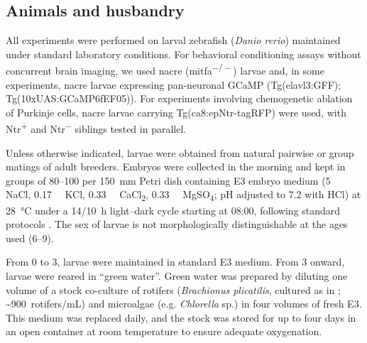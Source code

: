 \subsection{Animals and husbandry}

All experiments were performed on larval zebrafish (\textit{Danio rerio}) maintained under standard laboratory conditions. For behavioral conditioning assays without concurrent brain imaging, we used nacre (mitfa\textsuperscript{\(-/-\)}) larvae and, in some experiments, nacre larvae expressing pan-neuronal GCaMP (Tg(elavl3:GFF); Tg(10xUAS:GCaMP6fEF05)). For experiments involving chemogenetic ablation of Purkinje cells, nacre larvae carrying Tg(ca8:epNtr-tagRFP) were used, with Ntr\textsuperscript{\(+\)} and Ntr\textsuperscript{\(-\)} siblings tested in parallel.

Unless otherwise indicated, larvae were obtained from natural pairwise or group matings of adult breeders. Embryos were collected in the morning and kept in groups of 80--100 per 150~mm Petri dish containing E3 embryo medium (\SI{5}{\milli\Molar} NaCl, \SI{0.17}{\milli\Molar} KCl, \SI{0.33}{\milli\Molar} CaCl\textsubscript{2}, \SI{0.33}{\milli\Molar} MgSO\textsubscript{4}; pH adjusted to 7.2 with HCl) at \SI{28}{\degreeCelsius} under a 14/10~h light--dark cycle starting at 08:00, following standard protocols \citep{Westerfield2007,Martins2016}. The sex of larvae is not morphologically distinguishable at the ages used (\SIrange{6}{9}{\dpf}). %

From \SI{0}{\dpf} to \SI{3}{\dpf}, larvae were maintained in standard E3 medium. From \SI{3}{\dpf} onward, larvae were reared in ``green water''. Green water was prepared by diluting one volume of a stock co-culture of rotifers (\textit{Brachionus plicatilis}, cultured as in \citet{Martins2016}; \textasciitilde900~rotifers/mL) and microalgae (e.g. \textit{Chlorella} sp.) in four volumes of fresh E3. This medium was replaced daily, and the stock was stored for up to four days in an open container at room temperature to ensure adequate oxygenation.

